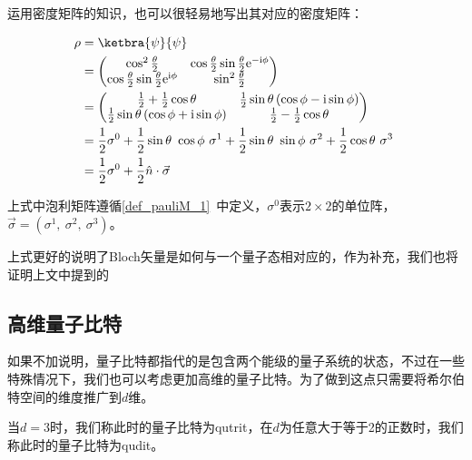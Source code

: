 运用密度矩阵的知识，也可以很轻易地写出其对应的密度矩阵：

\begin{equation}
\begin{aligned}
\rho &= \ketbra{\psi}{\psi} \\
&=  \begin{pmatrix}
    \cos^2\frac{\theta}{2} & \cos\frac{\theta}{2} \sin\frac{\theta}{2}\mathrm{e}^{-\mathrm{i}\phi} \\
    \cos\frac{\theta}{2} \sin\frac{\theta}{2}\mathrm{e}^{\mathrm{i}\phi} & \sin^2\frac{\theta}{2} \\
    \end{pmatrix} \\
&=  \begin{pmatrix}
    \frac{1}{2} + \frac{1}{2}\cos\theta & \frac{1}{2}\sin\theta\left( \cos\phi - \mathrm{i}\sin\phi \right)\\
    \frac{1}{2}\sin\theta\left( \cos\phi + \mathrm{i}\sin\phi \right) & \frac{1}{2} - \frac{1}{2}\cos \theta \\
    \end{pmatrix} \\
&= \frac{1}{2}\sigma^0 + \frac{1}{2}\sin\theta ~\cos\phi~\sigma^1 + \frac{1}{2}\sin\theta ~\sin\phi~\sigma^2 + \frac{1}{2}\cos\theta~\sigma^3 \\
&= \frac{1}{2} \sigma^0 + \frac{1}{2}\hat{n}\cdot \vec{\sigma}
\end{aligned}~
\end{equation}

上式中泡利矩阵遵循\autoref{def_pauliM_1}~中定义，$\sigma^0$表示$2\times 2$的单位阵，$\vec{\sigma} = \left( \sigma^1 ,~\sigma^2,~\sigma^3 \right)$。

上式更好的说明了Bloch矢量是如何与一个量子态相对应的，作为补充，我们也将证明上文中提到的









\subsection{高维量子比特}

如果不加说明，量子比特都指代的是包含两个能级的量子系统的状态，不过在一些特殊情况下，我们也可以考虑更加高维的量子比特。为了做到这点只需要将希尔伯特空间的维度推广到$d$维。

当$d=3$时，我们称此时的量子比特为qutrit，在$d$为任意大于等于2的正数时，我们称此时的量子比特为qudit。

